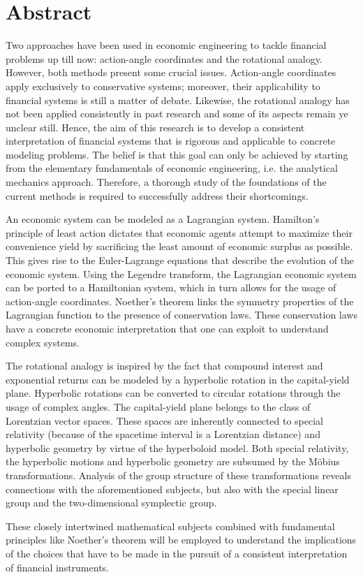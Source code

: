 \chapter*{Abstract}%
Two approaches have been used in economic engineering to tackle financial problems up till now: action-angle coordinates and the rotational analogy. However, both methods present some crucial issues. Action-angle coordinates apply exclusively to conservative systems; moreover, their applicability to financial systems is still a matter of debate. Likewise, the rotational analogy has not been applied consistently in past research and some of its aspects remain ye unclear still. Hence, the aim of this research is to develop a consistent interpretation of financial systems that is rigorous and applicable to concrete modeling problems. The belief is that this goal can only be achieved by starting from the elementary fundamentals of economic engineering, i.e. the analytical mechanics approach. Therefore, a thorough study of the foundations of the current methods is required to successfully address their shortcomings.

An economic system can be modeled as a Lagrangian system. Hamilton's principle of least action dictates that economic agents attempt to maximize their convenience yield by sacrificing the least amount of economic surplus as possible. This gives rise to the Euler-Lagrange equations that describe the evolution of the economic system. Using the Legendre transform, the Lagrangian economic system can be ported to a Hamiltonian system, which in turn allows for the usage of action-angle coordinates. Noether's theorem links the symmetry properties of the Lagrangian function to the presence of conservation laws. These conservation laws have a concrete economic interpretation that one can exploit to understand complex systems.

The rotational analogy is inspired by the fact that compound interest and exponential returns can be modeled by a hyperbolic rotation in the capital-yield plane. Hyperbolic rotations can be converted to circular rotations through the usage of complex angles. The capital-yield plane belongs to the class of Lorentzian vector spaces. These spaces are inherently connected to special relativity (because of the spacetime interval is a Lorentzian distance) and hyperbolic geometry by virtue of the hyperboloid model. Both special relativity, the hyperbolic motions and hyperbolic geometry are subsumed by the Möbius transformations. Analysis of the group structure of these transformations reveals connections with the aforementioned subjects, but also with the special linear group and the two-dimensional symplectic group.

These closely intertwined mathematical subjects combined with fundamental principles like Noether's theorem will be employed to understand the implications of the choices that have to be made in the pursuit of a consistent interpretation of financial instruments.